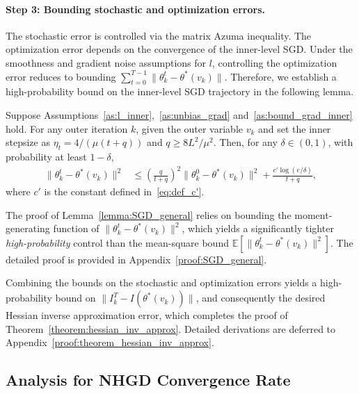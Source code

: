 \documentclass[11 pt]{article}
\begin{document}
\paragraph{Step 3: Bounding stochastic and optimization errors.}
The stochastic error is controlled via the matrix Azuma inequality. The optimization error depends on the convergence of the inner-level SGD. Under the smoothness and gradient noise assumptions for $l$, controlling the optimization error
reduces to bounding $\sum_{t=0}^{T-1}\|\theta_k^{t} - \theta^*(v_k)\|$. Therefore, we establish a high-probability bound on the inner-level SGD trajectory in the following lemma.


\begin{lemma}\label{lemma:SGD_general}
Suppose Assumptions~\ref{as:l_inner},~\ref{as:unbias_grad} and~\ref{as:bound_grad_inner} hold. 
For any outer iteration $k$, given the outer variable $v_k$ and set the inner stepsize as $\eta_t=4/(\mu(t+q))$ and $
q \ge 8L^2/\mu^2$.
Then, for any $\delta \in (0,1)$, with probability at least $1-\delta$,
\begin{align*}
\|\theta_k^{t}-\theta^*(v_k)\|^2
&\le  \left(\frac{q}{t+q}\right)^2\|\theta_k^{0}-\theta^*(v_k)\|^2 +
\frac{c'\log(e/\delta)}{t+q},
\end{align*}
where $c'$ is the constant defined in~\eqref{eq:def_c'}.
\end{lemma}


\begin{remark}
The proof of Lemma~\ref{lemma:SGD_general} relies on bounding the moment-generating function
of $\|\theta_k^{t}-\theta^*(v_k)\|^2$, which yields a significantly tighter
\emph{high-probability} control than the mean-square bound
$\mathbb{E}\!\left[\|\theta_k^{t}-\theta^*(v_k)\|^2\right]$. 
The detailed proof is provided in Appendix~\ref{proof:SGD_general}. 
\end{remark}


Combining the bounds on the stochastic and optimization errors yields a high-probability bound on
$\|I_k^{T} - I(\theta^*(v_k))\|$, and consequently the desired Hessian inverse approximation error, which completes the proof of Theorem~\ref{theorem:hessian_inv_approx}.
Detailed derivations are deferred to Appendix~\ref{proof:theorem_hessian_inv_approx}.


\subsection{Analysis for NHGD Convergence Rate}\label{sec:convergence_NHGD}
\end{document}
